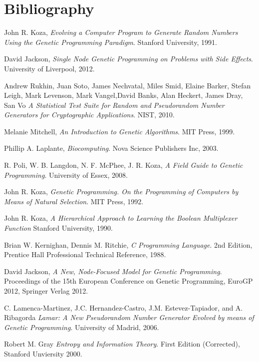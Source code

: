 \documentclass[a4paper,10.5pt]{article}
\begin{document}
\section{Bibliography}
\begin{thebibliography}{11}

  John R. Koza, 
  \emph{Evolving a Computer Program to Generate Random Numbers Using the Genetic Programming Paradigm}. 
  Stanford University, 
  1991.

  David Jackson,
  \emph{Single Node Genetic Programming on Problems with Side Effects}.
  University of Liverpool,
  2012.

  Andrew Rukhin, Juan Soto, James Nechvatal, Miles Smid, Elaine Barker, Stefan Leigh, Mark Levenson, Mark Vangel,David Banks, Alan Heckert, James Dray, San Vo 
  \emph{A Statistical Test Suite for Random and Pseudorandom Number Generators for Cryptographic Applications}. 
  NIST,
  2010.

  Melanie Mitchell,
  \emph{An Introduction to Genetic Algorithms}.
  MIT Press,
  1999.

  Phillip A. Laplante,
  \emph{Biocomputing}.
  Nova Science Publishers Inc,
  2003.

  R. Poli, W. B. Langdon, N. F. McPhee, J. R. Koza, 
  \emph{A Field Guide to Genetic Programming}. 
  University of Essex, 
  2008.

  John R. Koza, 
  \emph{Genetic Programming. On the Programming of Computers by Means of Natural Selection}. 
  MIT Press, 
  1992.

  John R. Koza,
  \emph{A Hierarchical Approach to Learning the Boolean Multiplexer Function}
  Stanford University,
  1990.

  Brian W. Kernighan, Dennis M. Ritchie, 
  \emph{C Programming Language}.
  2nd Edition, 
  Prentice Hall Professional Technical Reference, 
  1988.

  David Jackson,
  \emph{A New, Node-Focused Model for Genetic Programming}.
  Proceedings of the 15th European Conference on Genetic Programming, EuroGP 2012, 
  Springer Verlag
  2012.

  C. Lamenca-Martinez, J.C. Hernandez-Castro,
  J.M. Estevez-Tapiador, and A. Ribagorda
  \emph{Lamar: A New Pseudorandom Number Generator Evolved by means of Genetic Programming}.
  University of Madrid,
  2006.

  Robert M. Gray
  \emph{Entropy and Information Theory}.
  First Edition (Corrected),
  Stanford Unviersity
  2000.

\end{thebibliography}
\end{document}
